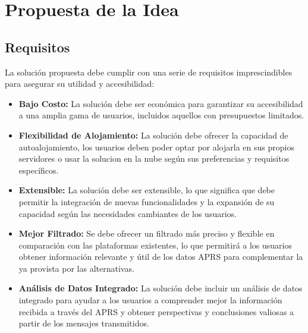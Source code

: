 \titlespacing*{\chapter}{0pt}{-1.25cm}{25pt}
\chapter{Propuesta de la Idea}

\section{Requisitos}

La solución propuesta debe cumplir con una serie de requisitos imprescindibles para asegurar su utilidad y accesibilidad:

\begin{itemize}
    \item \textbf{Bajo Costo:} La solución debe ser económica para garantizar su accesibilidad a una amplia gama de usuarios, incluidos aquellos con presupuestos limitados.
    
    \item \textbf{Flexibilidad de Alojamiento:} La solución debe ofrecer la capacidad de autoalojamiento, los usuarios deben poder optar por alojarla en sus propios servidores o usar la solucion en la nube según sus preferencias y requisitos específicos.
    
    \item \textbf{Extensible:} La solución debe ser extensible, lo que significa que debe permitir la integración de nuevas funcionalidades y la expansión de su capacidad según las necesidades cambiantes de los usuarios.
    
    \item \textbf{Mejor Filtrado:} Se debe ofrecer un filtrado más preciso y flexible en comparación con las plataformas existentes, lo que permitirá a los usuarios obtener información relevante y útil de los datos APRS para complementar la ya provista por las alternativas.
    
	\item \textbf{Análisis de Datos Integrado:} La solución debe incluir un análisis de datos integrado para ayudar a los usuarios a comprender mejor la información recibida a través del APRS y obtener perspectivas y conclusiones valiosas a partir de los mensajes transmitidos.
	
\end{itemize}

